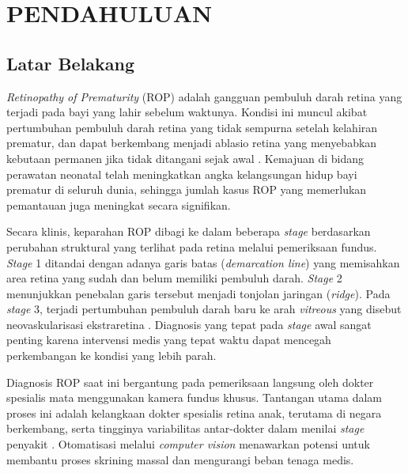 
\chapter{PENDAHULUAN}

\section{Latar Belakang}

\textit{Retinopathy of Prematurity} (ROP) adalah gangguan pembuluh darah retina yang terjadi
pada bayi yang lahir sebelum waktunya. Kondisi ini muncul akibat pertumbuhan pembuluh darah
retina yang tidak sempurna setelah kelahiran prematur, dan dapat berkembang menjadi ablasio
retina yang menyebabkan kebutaan permanen jika tidak ditangani sejak awal
\citep{Chiang2021, Vahidmoghadam2026}. Kemajuan di bidang perawatan neonatal telah meningkatkan
angka kelangsungan hidup bayi prematur di seluruh dunia, sehingga jumlah kasus ROP yang
memerlukan pemantauan juga meningkat secara signifikan.

Secara klinis, keparahan ROP dibagi ke dalam beberapa \textit{stage} berdasarkan perubahan
struktural yang terlihat pada retina melalui pemeriksaan fundus. \textit{Stage} 1 ditandai
dengan adanya garis batas (\textit{demarcation line}) yang memisahkan area retina yang sudah
dan belum memiliki pembuluh darah. \textit{Stage} 2 menunjukkan penebalan garis tersebut
menjadi tonjolan jaringan (\textit{ridge}). Pada \textit{stage} 3, terjadi pertumbuhan
pembuluh darah baru ke arah \textit{vitreous} yang disebut neovaskularisasi ekstraretina
\citep{Chiang2021}. Diagnosis yang tepat pada \textit{stage} awal sangat penting karena
intervensi medis yang tepat waktu dapat mencegah perkembangan ke kondisi yang lebih parah.

Diagnosis ROP saat ini bergantung pada pemeriksaan langsung oleh dokter spesialis mata
menggunakan kamera fundus khusus. Tantangan utama dalam proses ini adalah kelangkaan dokter
spesialis retina anak, terutama di negara berkembang, serta tingginya variabilitas antar-dokter
dalam menilai \textit{stage} penyakit \citep{Tong2020}. Otomatisasi melalui \textit{computer
vision} menawarkan potensi untuk membantu proses skrining massal dan mengurangi beban tenaga
medis.

